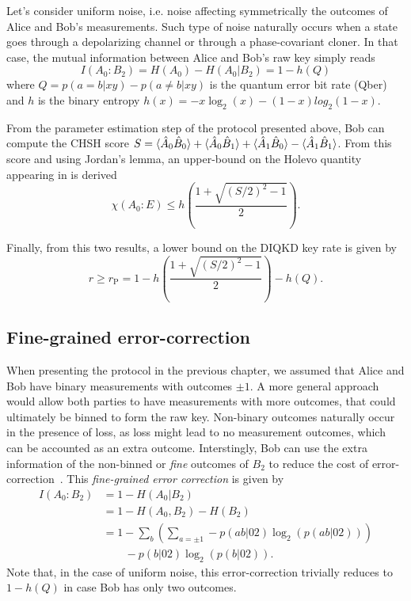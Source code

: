 Let's consider uniform noise, i.e. noise affecting symmetrically the outcomes of Alice and Bob's measurements.
Such type of noise naturally occurs when a state goes through a depolarizing channel or through a phase-covariant cloner.
In that case, the mutual information between Alice and Bob's raw key simply reads
\begin{equation}
	I(A_0 : B_2) = H(A_0) - H(A_0|B_2) = 1 - h(Q)
\end{equation}
where $Q=p(a=b|xy)-p(a\neq b |xy)$ is the quantum error bit rate (Qber) and $h$ is the binary entropy $h(x)=-x \log_2(x) - (1-x)log_2(1-x)$.

From the parameter estimation step of the protocol presented above, Bob can compute the CHSH score $S=\langle {\hat{A}_0 \hat{B}_0} \rangle + \langle {\hat{A}_0 \hat{B}_1} \rangle + \langle {\hat{A}_1 \hat{B}_0} \rangle - \langle {\hat{A}_1 \hat{B}_1} \rangle$.
From this score and using Jordan's lemma, an upper-bound on the Holevo quantity appearing in  is derived
\begin{equation}
	\chi(A_0 : E) \leq h\left(\frac{1+\sqrt{(S/2)^2-1}}{2} \right).
	\label{eq:holevo_pironio}
\end{equation}

Finally, from this two results, a lower bound on the DIQKD key rate is given by
\begin{equation}
	r \geq r_\mathrm{P} = 1 - h\left(\frac{1+\sqrt{(S/2)^2-1}}{2} \right) - h(Q).
	\label{eq:pironio}
\end{equation}

\subsection{Fine-grained error-correction}
\label{sec:Ma_Lutk}

When presenting the protocol in the previous chapter, we assumed that Alice and Bob have binary measurements with outcomes $\pm 1$.
A more general approach would allow both parties to have measurements with more outcomes, that could ultimately be binned to form the raw key.
Non-binary outcomes naturally occur in the presence of loss, as loss might lead to no measurement outcomes, which can be accounted as an extra outcome.
Interstingly, Bob can use the extra information of the non-binned or \textit{fine} outcomes of $B_2$ to reduce the cost of error-correction~\cite{Ma2012}.
This \textit{fine-grained error correction} is given by
\begin{equation}
	\begin{split}
		I(A_0 : B_2) &= 1-H(A_0|B_2) \\
					 &= 1-H(A_0,B_2) - H(B_2) \\
					 &= 1-\sum_b \left( \sum_{a = \pm1} -p(ab|02)\log_2(p(ab|02)) \right) \\
					 &\qquad - p(b|02)\log_2(p(b|02)).
	\end{split}
	\label{eq:Ma}
\end{equation}
Note that, in the case of uniform noise, this error-correction trivially reduces to $1-h(Q)$ in case Bob has only two outcomes.

